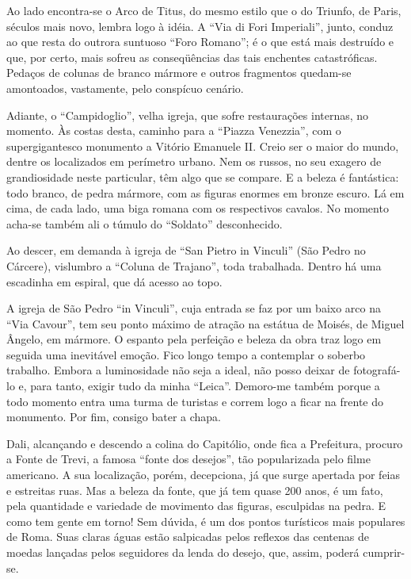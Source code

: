 Ao lado encontra-se o Arco de Titus, do mesmo estilo que o do Triunfo, de Paris, séculos mais novo, lembra logo à idéia. A ``Via di Fori Imperiali'', junto, conduz ao que resta do outrora suntuoso ``Foro Romano''; é o que está mais destruído e que, por certo, mais sofreu as conseqüências das tais enchentes catastróficas. Pedaços de colunas de branco mármore e outros fragmentos quedam-se amontoados, vastamente, pelo conspícuo cenário.

Adiante, o ``Campidoglio'', velha igreja, que sofre restaurações internas, no momento. Às costas desta, caminho para a ``Piazza Venezzia'', com o supergigantesco monumento a Vitório Emanuele II. Creio ser o maior do mundo, dentre os localizados em perímetro urbano. Nem os russos, no seu exagero de grandiosidade neste particular, têm algo que se compare. E a beleza é fantástica: todo branco, de pedra mármore, com as figuras enormes em bronze escuro. Lá em cima, de cada lado, uma biga romana com os respectivos cavalos. No momento acha-se também ali o túmulo do ``Soldato'' desconhecido.

Ao descer, em demanda à igreja de ``San Pietro in Vinculi'' (São Pedro no Cárcere), vislumbro a ``Coluna de Trajano'', toda trabalhada. Dentro há uma escadinha em espiral, que dá acesso ao topo.

A igreja de São Pedro ``in Vinculi'', cuja entrada se faz por um baixo arco na ``Via Cavour'', tem seu ponto máximo de atração na estátua de Moisés, de Miguel Ângelo, em mármore. O espanto pela perfeição e beleza da obra traz logo em seguida uma inevitável emoção. Fico longo tempo a contemplar o soberbo trabalho. Embora a luminosidade não seja a ideal, não posso deixar de fotografá-lo e, para tanto, exigir tudo da minha ``Leica''. Demoro-me também porque a todo momento entra uma turma de turistas e correm logo a ficar na frente do monumento. Por fim, consigo bater a chapa.

Dali, alcançando e descendo a colina do Capitólio, onde fica a Prefeitura, procuro a Fonte de Trevi, a famosa ``fonte dos desejos'', tão popularizada pelo filme americano. A sua localização, porém, decepciona, já que surge apertada por feias e estreitas ruas. Mas a beleza da fonte, que já tem quase 200 anos, é um fato, pela quantidade e variedade de movimento das figuras, esculpidas na pedra. E como tem gente em torno! Sem dúvida, é um dos pontos turísticos mais populares de Roma. Suas claras águas estão salpicadas pelos reflexos das centenas de moedas lançadas pelos seguidores da lenda do desejo, que, assim, poderá cumprir-se.

